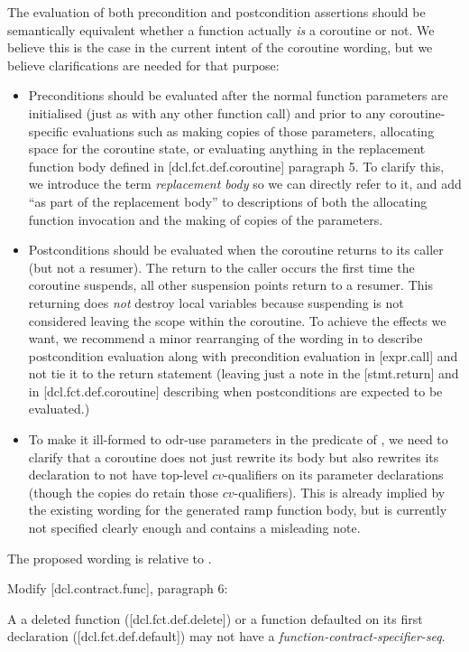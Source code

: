 The evaluation of both precondition and postcondition assertions should be semantically equivalent whether a function actually \emph{is} a coroutine or not.  We believe this is the case in the current intent of the coroutine wording, but we believe clarifications are needed for that purpose:
\begin{itemize}
\item Preconditions should be evaluated after the normal function parameters are initialised (just as with any other function call) and prior to any coroutine-specific evaluations such as making copies of those parameters, allocating space for the coroutine state, or evaluating anything in the replacement function body defined in [dcl.fct.def.coroutine] paragraph 5.  To clarify this, we  introduce the term \emph{replacement body} so we can directly refer to it, and add ``as part of the replacement body'' to descriptions of both the allocating function invocation and the making of copies of the parameters.
\item Postconditions should be evaluated when the coroutine returns to its caller (but not a resumer).  The return to the caller occurs the first time the coroutine suspends, all other suspension points return to a resumer.   This returning does \emph{not} destroy local variables because suspending is not considered leaving the scope within the coroutine.   To achieve the effects we want, we recommend a minor rearranging of the wording in \cite{P2900R8} to describe postcondition evaluation along with precondition evaluation in [expr.call] and not tie it to the return statement (leaving just a note in the [stmt.return] and in [dcl.fct.def.coroutine] describing when postconditions are expected to be evaluated.)
\item To make it ill-formed to odr-use parameters in the predicate of , we need to clarify that a coroutine does not just rewrite its body but also rewrites its declaration to not have top-level $cv$-qualifiers on its parameter declarations (though the copies do retain those $cv$-qualifiers).  This is already implied by the existing wording for the generated ramp function body, but is currently not specified clearly enough and contains a misleading note.
\end{itemize}

The proposed wording is relative to \cite{P2900R8}.

Modify [dcl.contract.func], paragraph 6:
\begin{adjustwidth}{0.5cm}{0.5cm}
A a deleted function ([dcl.fct.def.delete])\removed{,} or a function defaulted on its first declaration ([dcl.fct.def.default]) may not have a \emph{function-contract-specifier-seq}.
\end{adjustwidth}

